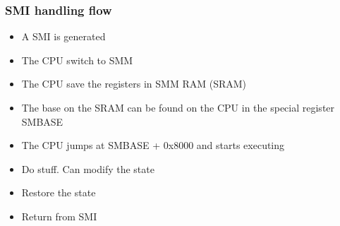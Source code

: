         \begin{frame}
                \frametitle{SMI handling flow}
                \begin{itemize}
                        \item A SMI is generated
                        \item The CPU switch to SMM
                        \item The CPU save the registers in SMM RAM
                        (SRAM)
                        \item The base on the SRAM can be found on the
                        CPU in the special register SMBASE
                        \item The CPU jumps at SMBASE + 0x8000 and
                        starts executing
                        \item Do stuff. Can modify the state
                        \item Restore the state
                        \item Return from SMI
                \end{itemize}
        \end{frame}

